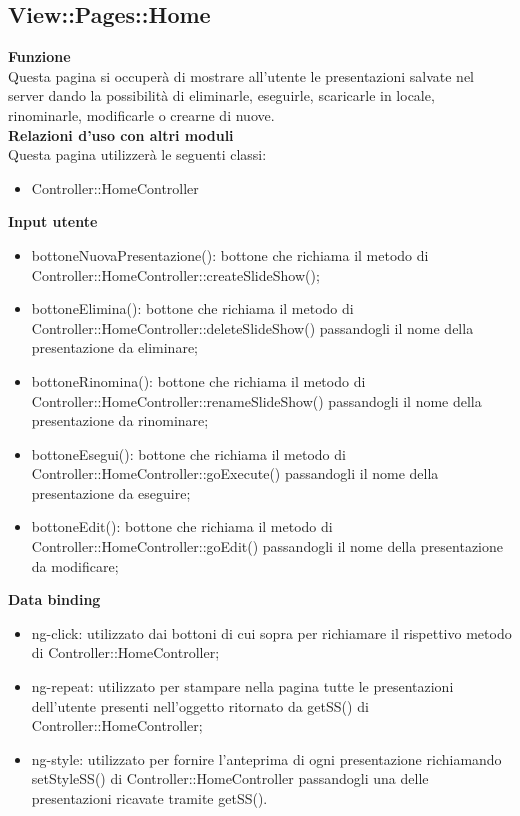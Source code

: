 {\subsection{View::Pages::Home}{
	\textbf{Funzione}\\
	\indent Questa pagina si occuperà di mostrare all'utente le presentazioni salvate nel server dando la possibilità di eliminarle, eseguirle, scaricarle in locale, rinominarle, modificarle o crearne di nuove.\\
	\textbf{Relazioni d'uso con altri moduli}\\
	\indent Questa pagina utilizzerà le seguenti classi:
	\begin{itemize}
		\item Controller::HomeController
	\end{itemize}
	\textbf{Input utente}
	\begin{itemize}
		\item bottoneNuovaPresentazione(): bottone che richiama il metodo di Controller::HomeController::createSlideShow();
		\item bottoneElimina(): bottone che richiama il metodo di Controller::HomeController::deleteSlideShow() passandogli il nome della presentazione da eliminare;
		\item bottoneRinomina(): bottone che richiama il metodo di Controller::HomeController::renameSlideShow() passandogli il nome della presentazione da rinominare;
		\item bottoneEsegui(): bottone che richiama il metodo di Controller::HomeController::goExecute() passandogli il nome della presentazione da eseguire;
		\item bottoneEdit(): bottone che richiama il metodo di Controller::\-HomeController::goEdit() passandogli il nome della presentazione da modificare;
	\end{itemize}
	\textbf{Data binding}
	\begin{itemize}
		\item ng-click: utilizzato dai bottoni di cui sopra per richiamare il rispettivo metodo di Controller::\-HomeController;
		\item ng-repeat: utilizzato per stampare nella pagina tutte le presentazioni dell'utente presenti nell'oggetto ritornato da getSS() di Controller::HomeController;
		\item ng-style: utilizzato per fornire l'anteprima di ogni presentazione richiamando setStyleSS() di Controller::HomeController passandogli una delle presentazioni ricavate tramite getSS().
	\end{itemize}
	}
}
